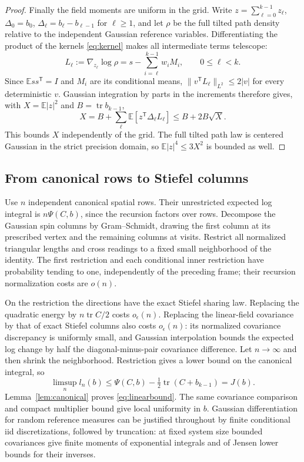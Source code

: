 \documentclass[11pt]{article}
\numberwithin{equation}{section}
\theoremstyle{definition}
\newcommand{\E}{\mathbb E}
\newcommand{\tr}{\operatorname{tr}}
\begin{document}
\begin{proof}
Finally the field moments are uniform in the grid. Write $z=\sum_{\ell=0}^{k-1}z_\ell$, $\Delta_0=b_0$, $\Delta_\ell=b_\ell-b_{\ell-1}$ for $\ell\ge1$, and let $\rho$ be the full tilted path density relative to the independent Gaussian reference variables. Differentiating the product of the kernels \eqref{eq:kernel} makes all intermediate terms telescope:
\[
L_\ell:=\nabla_{z_\ell}\log\rho
=s-\sum_{i=\ell}^{k-1}w_iM_i,
\qquad 0\le\ell<k.
\]
Since $\E ss^{\mathsf T}=I$ and $M_i$ are its conditional means,
$\|v^{\mathsf T}L_\ell\|_{L^2}\le2|v|$ for every deterministic $v$. Gaussian integration by parts in the increments therefore gives, with $X=\E|z|^2$ and $B=\tr b_{k-1}$,
\[
X=B+\sum_\ell\E[z^{\mathsf T}\Delta_\ell L_\ell]
\le B+2B\sqrt X.
\]
This bounds $X$ independently of the grid. The full tilted path law is centered Gaussian in the strict precision domain, so $\E|z|^4\le3X^2$ is bounded as well.
\end{proof}

\subsection{From canonical rows to Stiefel columns}
Use $n$ independent canonical spatial rows. Their unrestricted expected log integral is $n\Psi(C,b)$, since the recursion factors over rows. Decompose the Gaussian spin columns by Gram--Schmidt, drawing the first column at its prescribed vertex and the remaining columns at visits. Restrict all normalized triangular lengths and cross readings to a fixed small neighborhood of the identity. The first restriction and each conditional inner restriction have probability tending to one, independently of the preceding frame; their recursion normalization costs are $o(n)$.

On the restriction the directions have the exact Stiefel sharing law. Replacing the quadratic energy by $n\tr C/2$ costs $o_\epsilon(n)$. Replacing the linear-field covariance by that of exact Stiefel columns also costs $o_\epsilon(n)$: its normalized covariance discrepancy is uniformly small, and Gaussian interpolation bounds the expected log change by half the diagonal-minus-pair covariance difference. Let $n\to\infty$ and then shrink the neighborhood. Restriction gives a lower bound on the canonical integral, so
\[
\limsup_n l_n(b)\le\Psi(C,b)-\tfrac12\tr(C+b_{k-1})=J(b).
\]
Lemma~\ref{lem:canonical} proves \eqref{eq:linearbound}. The same covariance comparison and compact multiplier bound give local uniformity in $b$. Gaussian differentiation for random reference measures can be justified throughout by finite conditional iid discretizations, followed by truncation: at fixed system size bounded covariances give finite moments of exponential integrals and of Jensen lower bounds for their inverses.
\end{document}
